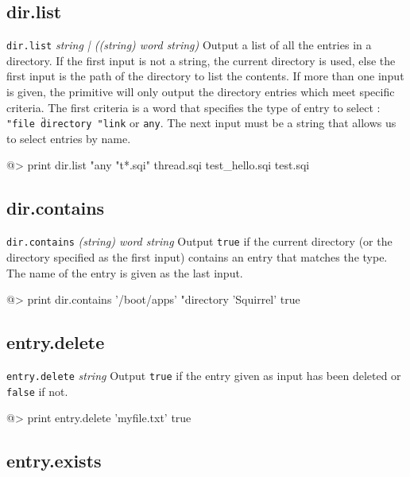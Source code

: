 \subsection*{dir.list} 

{\tt dir.list} {\it string | ((string) word string) }
\newline\newline
Output a list of all the entries in a directory. If the first input is not a string, the current directory is used, else the first input is the path of the directory to list the contents. If more than one input is given, the primitive will only output the directory entries which meet specific criteria. The first criteria is a word that specifies the type of entry to select : {\tt "file \"directory "link} or {\tt any}. The next input must be a string that allows us to select entries by name.
\begin{verbatimtab}
@> print dir.list "any "t*.sqi"
thread.sqi test_hello.sqi test.sqi
\end{verbatimtab}

\subsection*{dir.contains} 

{\tt dir.contains} {\it (string) word string}
\newline\newline
Output {\tt true} if the current directory (or the directory specified as the first input) contains an entry that matches the type. The name of the entry is given as the last input.
\begin{verbatimtab}
@> print dir.contains '/boot/apps' "directory 'Squirrel'
true
\end{verbatimtab}

\subsection*{entry.delete} 

{\tt entry.delete} {\it string}
\newline\newline
Output {\tt true} if the entry given as input has been deleted or {\tt false} if not.
\begin{verbatimtab}
@> print entry.delete 'myfile.txt'
true
\end{verbatimtab}
\cbstart
\subsection*{entry.exists} 

